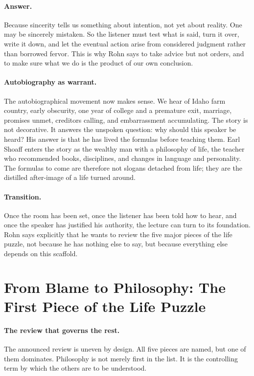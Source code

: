 \paragraph{Answer.}
Because sincerity tells us something about intention, not yet about reality. One may be sincerely mistaken. So the listener must test what is said, turn it over, write it down, and let the eventual action arise from considered judgment rather than borrowed fervor. This is why Rohn says to take advice but not orders, and to make sure what we do is the product of our own conclusion.

\paragraph{Autobiography as warrant.}
The autobiographical movement now makes sense. We hear of Idaho farm country, early obscurity, one year of college and a premature exit, marriage, promises unmet, creditors calling, and embarrassment accumulating. The story is not decorative. It answers the unspoken question: why should this speaker be heard? His answer is that he has lived the formulas before teaching them. Earl Shoaff enters the story as the wealthy man with a philosophy of life, the teacher who recommended books, disciplines, and changes in language and personality. The formulas to come are therefore not slogans detached from life; they are the distilled after-image of a life turned around.

\paragraph{Transition.}
Once the room has been set, once the listener has been told how to hear, and once the speaker has justified his authority, the lecture can turn to its foundation. Rohn says explicitly that he wants to review the five major pieces of the life puzzle, not because he has nothing else to say, but because everything else depends on this scaffold.

\section{From Blame to Philosophy: The First Piece of the Life Puzzle}

\paragraph{The review that governs the rest.}
The announced review is uneven by design. All five pieces are named, but one of them dominates. Philosophy is not merely first in the list. It is the controlling term by which the others are to be understood.

